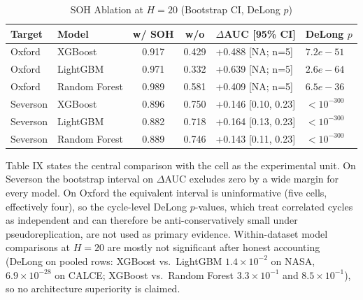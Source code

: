 \documentclass[conference]{IEEEtran}
\begin{document}
\begin{table}[!t]
\caption{SOH Ablation at $H{=}20$ (Bootstrap CI, DeLong $p$)}
\label{tab:soh}
\centering
\begin{tabular}{|l|l|c|c|l|l|}
\hline
\textbf{Target} & \textbf{Model} & \textbf{w/ SOH} & \textbf{w/o} & \textbf{$\Delta$AUC [95\% CI]} & \textbf{DeLong $p$}\\
\hline
Oxford & XGBoost & 0.917 & 0.429 & +0.488 [NA; n=5] & $7.2e-51$ \\ \hline
Oxford & LightGBM & 0.971 & 0.332 & +0.639 [NA; n=5] & $2.6e-64$ \\ \hline
Oxford & Random Forest & 0.989 & 0.581 & +0.409 [NA; n=5] & $6.5e-36$ \\ \hline
Severson & XGBoost & 0.896 & 0.750 & +0.146 [0.10, 0.23] & $<10^{-300}$ \\ \hline
Severson & LightGBM & 0.882 & 0.718 & +0.164 [0.13, 0.23] & $<10^{-300}$ \\ \hline
Severson & Random Forest & 0.889 & 0.746 & +0.143 [0.11, 0.23] & $<10^{-300}$ \\ \hline
\end{tabular}
\end{table}

Table IX states the central comparison with the cell as the
experimental unit. On Severson the bootstrap interval on $\Delta$AUC
excludes zero by a wide margin for every model. On Oxford the
equivalent interval is uninformative (five cells, effectively four),
so the cycle-level DeLong $p$-values, which treat correlated cycles
as independent and can therefore be anti-conservatively small under
pseudoreplication, are not used as primary evidence. Within-dataset
model comparisons at $H{=}20$ are mostly not significant after honest
accounting (DeLong on pooled rows: XGBoost vs.\ LightGBM $1.4\times10^{-2}$
on NASA, $6.9\times10^{-28}$ on CALCE; XGBoost vs.\ Random Forest
$3.3\times10^{-1}$ and $8.5\times10^{-1}$), so no architecture
superiority is claimed.
\end{document}
